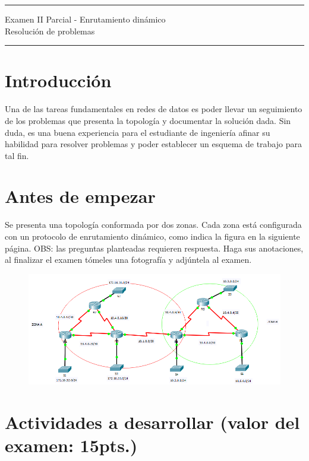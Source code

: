 \documentclass[12pt]{article}
\begin{document}

\begin{center}
\noindent\rule{\textwidth}{1pt}
\huge{Examen II Parcial - Enrutamiento dinámico}\\
\vspace{10px}
\small{Resolución de problemas}
\noindent\rule{\textwidth}{1pt}
\end{center}

\section{Introducción} 
Una de las tareas fundamentales en redes de datos es poder llevar un seguimiento de los problemas que presenta la topología y documentar la solución dada. Sin duda, es una buena experiencia para el estudiante de ingeniería afinar su habilidad para resolver problemas y poder establecer un esquema de trabajo para tal fin.

\section{Antes de empezar}
Se presenta una topología conformada por dos zonas. Cada zona está configurada con un protocolo de enrutamiento dinámico, como indica la figura en la siguiente página. OBS: las preguntas planteadas requieren respuesta. Haga sus anotaciones, al finalizar el examen tómeles una fotografía y adjúntela al examen. 

\begin{figure}[h]
\includegraphics[scale=0.8]{img_ex2p.PNG}
\end{figure}

\section{Actividades a desarrollar (valor del examen: 15pts.)}
\end{document}
